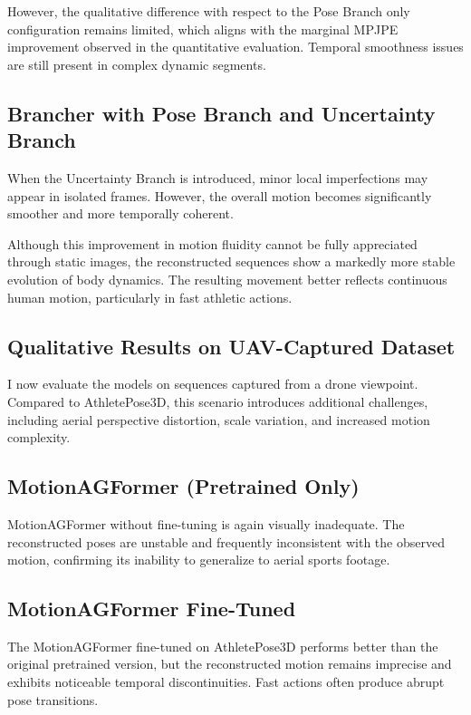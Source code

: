 However, the qualitative difference with respect to the Pose Branch only configuration remains limited, which aligns with the marginal MPJPE improvement observed in the quantitative evaluation. Temporal 
smoothness issues are still present in complex dynamic segments.

\subsection*{Brancher with Pose Branch and Uncertainty Branch}
When the Uncertainty Branch is introduced, minor local imperfections may appear in isolated frames. However, the overall motion becomes significantly smoother and more temporally coherent.

Although this improvement in motion fluidity cannot be fully appreciated through static images, the reconstructed sequences show a markedly more stable evolution of body dynamics. The resulting movement 
better reflects continuous human motion, particularly in fast athletic actions.
\newpage

\subsection{Qualitative Results on UAV-Captured Dataset}
I now evaluate the models on sequences captured from a drone viewpoint. Compared to AthletePose3D, this scenario introduces additional challenges, including aerial perspective distortion, scale variation, 
and increased motion complexity.

\subsection*{MotionAGFormer (Pretrained Only)}
MotionAGFormer without fine-tuning is again visually inadequate. The reconstructed poses are unstable and frequently inconsistent with the observed motion, confirming its inability to generalize to aerial 
sports footage.
\newpage
\subsection*{MotionAGFormer Fine-Tuned}
The MotionAGFormer fine-tuned on AthletePose3D performs better than the original pretrained version, but the reconstructed motion remains imprecise and exhibits noticeable temporal discontinuities. Fast 
actions often produce abrupt pose transitions.

